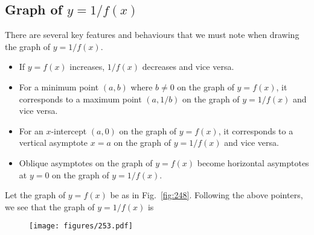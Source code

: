 \subsection{Graph of \texorpdfstring{$y = 1/f(x)$}{y = 1/f(x)}}

There are several key features and behaviours that we must note when drawing the graph of $y = 1/f(x)$.

\begin{itemize}
    \item If $y = f(x)$ increases, $1/f(x)$ decreases and vice versa.
    \item For a minimum point $(a,b)$ where $b \neq 0$ on the graph of $y = f(x)$, it corresponds to a maximum point $(a, 1/b)$ on the graph of $y = 1/f(x)$ and vice versa.
    \item For an $x$-intercept $(a, 0)$ on the graph of $y = f(x)$, it corresponds to a vertical asymptote $x = a$ on the graph of $y = 1/f(x)$ and vice versa.
    \item Oblique asymptotes on the graph of $y = f(x)$ become horizontal asymptotes at $y = 0$ on the graph of $y = 1/f(x)$.
\end{itemize}

\begin{example}[Graph of $y = 1/f(x)$]
    Let the graph of $y = f(x)$ be as in Fig.~\ref{fig:248}. Following the above pointers, we see that the graph of $y = 1/f(x)$ is
    \begin{figure}[H]
        \centering
        \hspace{7em}\texttt{[image: figures/253.pdf]}
        \caption{}
    \end{figure}
\end{example}